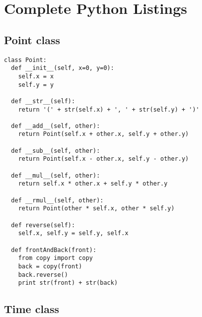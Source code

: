 

%
\chapter{Complete Python Listings}


\section{Point class}

\beforeverb
\begin{verbatim}
class Point:
  def __init__(self, x=0, y=0):
    self.x = x
    self.y = y

  def __str__(self):
    return '(' + str(self.x) + ', ' + str(self.y) + ')'

  def __add__(self, other):
    return Point(self.x + other.x, self.y + other.y)

  def __sub__(self, other):
    return Point(self.x - other.x, self.y - other.y)

  def __mul__(self, other):
    return self.x * other.x + self.y * other.y

  def __rmul__(self, other):
    return Point(other * self.x, other * self.y)

  def reverse(self):
    self.x, self.y = self.y, self.x

  def frontAndBack(front):
    from copy import copy
    back = copy(front)
    back.reverse()
    print str(front) + str(back)
\end{verbatim}
\afterverb


\section{Time class}

